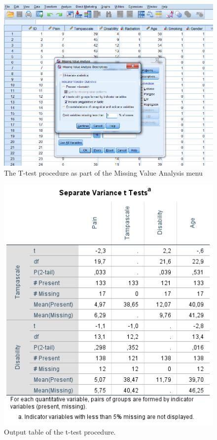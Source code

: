 \documentclass[]{book}
\begin{document}
\begin{figure}

{\centering \includegraphics[width=0.9\linewidth]{images/fig2.11} 

}

\caption{The T-test procedure as part of the Missing Value Analysis menu}\label{fig:fig39}
\end{figure}

\begin{figure}

{\centering \includegraphics[width=0.9\linewidth]{images/tab2.5} 

}

\caption{Output table of the t-test procedure.}\label{fig:tab5}
\end{figure}
\end{document}
